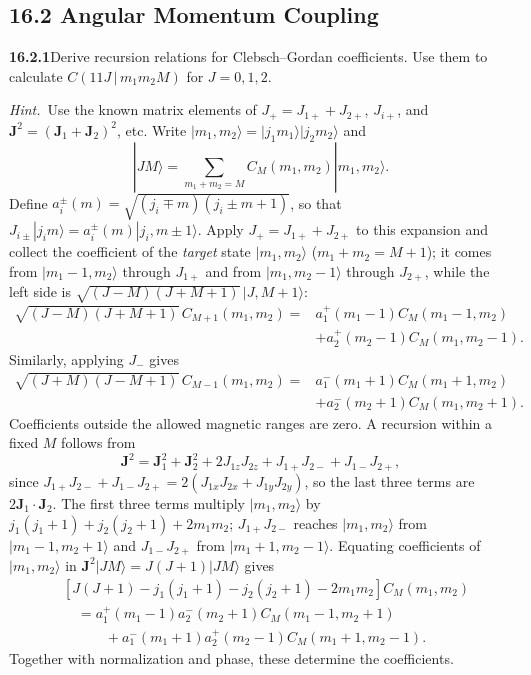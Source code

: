 \subsection*{16.2 Angular Momentum Coupling}

\par\bigskip
\noindent\textbf{16.2.1}\quad Derive recursion relations for
Clebsch--Gordan coefficients. Use them to calculate
$C(11J\,|\,m_{1}m_{2}M)$ for $J=0,1,2$.
\par\emph{Hint.}~Use the known matrix elements of
$J_{+}=J_{1+}+J_{2+}$, $J_{i+}$, and
$\mathbf{J}^{2}=(\mathbf{J}_{1}+\mathbf{J}_{2})^{2}$, etc.
\solution
Write $|m_1,m_2\rangle=|j_1m_1\rangle|j_2m_2\rangle$ and
\[
|JM\rangle=\sum_{m_1+m_2=M}C_M(m_1,m_2)|m_1,m_2\rangle.
\]
Define $a_i^\pm(m)=\sqrt{(j_i\mp m)(j_i\pm m+1)}$, so that
$J_{i\pm}|j_im\rangle=a_i^\pm(m)|j_i,m\pm1\rangle$.
Apply $J_+=J_{1+}+J_{2+}$ to this expansion and collect the
coefficient of the \emph{target} state $|m_1,m_2\rangle$
($m_1+m_2=M+1$); it comes from $|m_1-1,m_2\rangle$ through $J_{1+}$
and from $|m_1,m_2-1\rangle$ through $J_{2+}$, while the left side
is $\sqrt{(J-M)(J+M+1)}\,|J,M+1\rangle$:
\[
\begin{aligned}
\sqrt{(J-M)(J+M+1)}\,C_{M+1}(m_1,m_2)
={}&a_1^+(m_1-1)C_M(m_1-1,m_2)\\
&+a_2^+(m_2-1)C_M(m_1,m_2-1).
\end{aligned}
\]
Similarly, applying $J_-$ gives
\[
\begin{aligned}
\sqrt{(J+M)(J-M+1)}\,C_{M-1}(m_1,m_2)
={}&a_1^-(m_1+1)C_M(m_1+1,m_2)\\
&+a_2^-(m_2+1)C_M(m_1,m_2+1).
\end{aligned}
\]
Coefficients outside the allowed magnetic ranges are zero.
A recursion within a fixed $M$ follows from
\[
\mathbf J^2=\mathbf J_1^2+\mathbf J_2^2+2J_{1z}J_{2z}
+J_{1+}J_{2-}+J_{1-}J_{2+},
\]
since $J_{1+}J_{2-}+J_{1-}J_{2+}=2(J_{1x}J_{2x}+J_{1y}J_{2y})$, so the
last three terms are $2\mathbf J_1\cdot\mathbf J_2$. The first three
terms multiply $|m_1,m_2\rangle$ by
$j_1(j_1+1)+j_2(j_2+1)+2m_1m_2$; $J_{1+}J_{2-}$ reaches
$|m_1,m_2\rangle$ from $|m_1-1,m_2+1\rangle$ and $J_{1-}J_{2+}$ from
$|m_1+1,m_2-1\rangle$. Equating coefficients of $|m_1,m_2\rangle$ in
$\mathbf J^2|JM\rangle=J(J+1)|JM\rangle$ gives
\[
\begin{aligned}
&[J(J+1)-j_1(j_1+1)-j_2(j_2+1)-2m_1m_2]C_M(m_1,m_2)\\
&\quad=a_1^+(m_1-1)a_2^-(m_2+1)C_M(m_1-1,m_2+1)\\
&\qquad\quad+a_1^-(m_1+1)a_2^+(m_2-1)C_M(m_1+1,m_2-1).
\end{aligned}
\]
Together with normalization and phase, these determine the coefficients.

